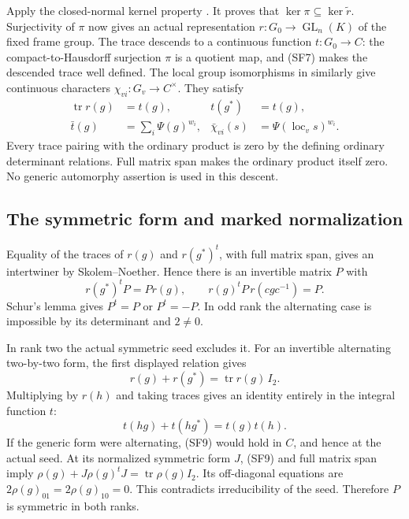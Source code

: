 Apply the closed-normal kernel property
.
It proves that \(\ker\pi\subseteq\ker\widetilde r\).
Surjectivity of \(\pi\) now gives an actual representation
\(r:G_0\to\operatorname{GL}_n(K)\) of the fixed frame group.
The trace descends to a continuous function
\(t:G_0\to C\): the compact-to-Hausdorff surjection
\(\pi\) is a quotient map, and (SF7) makes the descended
trace well defined. The local group isomorphisms in
 similarly give continuous characters
\(\chi_{vi}:G_v\to C^\times\).
They satisfy
\[
 \begin{aligned}
 \operatorname{tr}r(g)&=t(g),&
 t(g^*)&=t(g),\\
 \bar t(g)&=\sum_i\Psi(g)^{w_i},&
 \bar\chi_{vi}(s)&=\Psi(\operatorname{loc}_vs)^{w_i}.
 \end{aligned}                                                \tag{SF8}
\]
Every trace pairing with the ordinary product is zero
by the defining ordinary determinant relations.
Full matrix span makes the ordinary product itself
zero. No generic automorphy assertion is used in this
descent.

\subsection{The symmetric form and marked normalization}
Equality of the traces of \(r(g)\) and \(r(g^*)^t\),
with full matrix span, gives an intertwiner by
Skolem--Noether. Hence there is an invertible matrix
\(P\) with
\[
             r(g^*)^tP=Pr(g),\qquad
             r(g)^tP\,r(cgc^{-1})=P .
\]
Schur's lemma gives \(P^t=P\) or \(P^t=-P\).
In odd rank the alternating case is impossible
by its determinant and \(2\ne0\).

In rank two the actual symmetric seed excludes it.
For an invertible alternating two-by-two form,
the first displayed relation gives
\[
                    r(g)+r(g^*)=\operatorname{tr}r(g)\,I_2 .
\]
Multiplying by \(r(h)\) and taking traces gives
an identity entirely in the integral function \(t\):
\[
       t(hg)+t(hg^*)=t(g)t(h).                              \tag{SF9}
\]
If the generic form were alternating, (SF9) would
hold in \(C\), and hence at the actual seed.
At its normalized symmetric form \(J\), (SF9) and
full matrix span imply
\(\rho(g)+J\rho(g)^tJ=\operatorname{tr}\rho(g)I_2\).
Its off-diagonal equations are
\(2\rho(g)_{01}=2\rho(g)_{10}=0\).
This contradicts irreducibility of the seed.
Therefore \(P\) is symmetric in both ranks.

